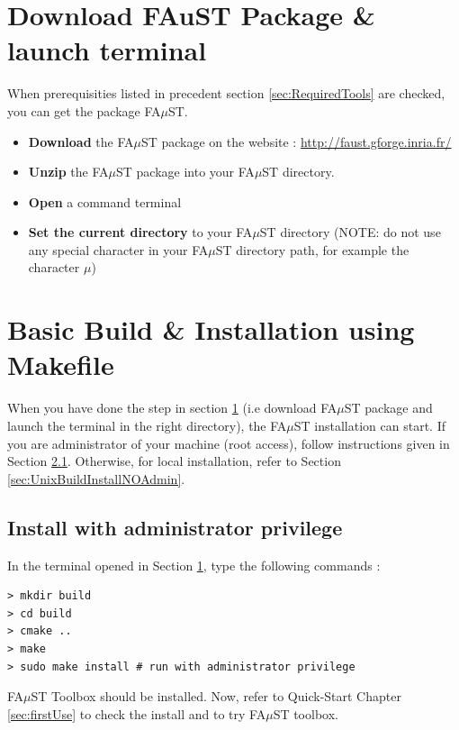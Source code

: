 \section{Download FAuST Package \& launch terminal}\label{sec:UnixBuildDownload}

When prerequisities listed in precedent section \ref{sec:RequiredTools} are checked, you can get the package FA$\mu$ST.
\begin{itemize}
\item \textbf{Download} the FA$\mu$ST package on the website :  \url{http://faust.gforge.inria.fr/}
\item \textbf{Unzip} the FA$\mu$ST package into your FA$\mu$ST directory.
\item \textbf{Open} a command terminal
\item \textbf{Set the current directory} to your FA$\mu$ST directory (NOTE: do not use any special character in your FA$\mu$ST directory path, for example the character $\mu$)
\end{itemize}



\section{Basic Build \& Installation using Makefile}\label{sec:UnixBuildInstall}

When you have done the step in section \ref{sec:UnixBuildDownload} (i.e download FA$\mu$ST package and launch the terminal in the right directory),  the FA$\mu$ST installation can start.
If you are administrator of your machine (root access), follow instructions given in Section \ref{sec:UnixBuildInstallAdmin}. Otherwise, for local installation, refer to Section \ref{sec:UnixBuildInstallNOAdmin}. 

\subsection{Install with administrator privilege}\label{sec:UnixBuildInstallAdmin}
In the terminal opened in Section 
\ref{sec:UnixBuildDownload}, type the following commands : 
\lstset{style=customBash}
\begin{lstlisting}
> mkdir build
> cd build
> cmake ..
> make
> sudo make install # run with administrator privilege
\end{lstlisting}

FA$\mu$ST Toolbox should be installed. Now, refer to Quick-Start Chapter \ref{sec:firstUse} to check the install and to try FA$\mu$ST toolbox.

